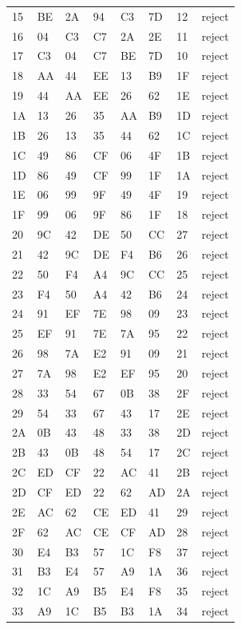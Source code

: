 \begin{longtable}{llllllll}
15 & BE & 2A & 94 & C3 & 7D & 12 & reject\\
16 & 04 & C3 & C7 & 2A & 2E & 11 & reject\\
17 & C3 & 04 & C7 & BE & 7D & 10 & reject\\
18 & AA & 44 & EE & 13 & B9 & 1F & reject\\
19 & 44 & AA & EE & 26 & 62 & 1E & reject\\
1A & 13 & 26 & 35 & AA & B9 & 1D & reject\\
1B & 26 & 13 & 35 & 44 & 62 & 1C & reject\\
1C & 49 & 86 & CF & 06 & 4F & 1B & reject\\
1D & 86 & 49 & CF & 99 & 1F & 1A & reject\\
1E & 06 & 99 & 9F & 49 & 4F & 19 & reject\\
1F & 99 & 06 & 9F & 86 & 1F & 18 & reject\\
20 & 9C & 42 & DE & 50 & CC & 27 & reject\\
21 & 42 & 9C & DE & F4 & B6 & 26 & reject\\
22 & 50 & F4 & A4 & 9C & CC & 25 & reject\\
23 & F4 & 50 & A4 & 42 & B6 & 24 & reject\\
24 & 91 & EF & 7E & 98 & 09 & 23 & reject\\
25 & EF & 91 & 7E & 7A & 95 & 22 & reject\\
26 & 98 & 7A & E2 & 91 & 09 & 21 & reject\\
27 & 7A & 98 & E2 & EF & 95 & 20 & reject\\
28 & 33 & 54 & 67 & 0B & 38 & 2F & reject\\
29 & 54 & 33 & 67 & 43 & 17 & 2E & reject\\
2A & 0B & 43 & 48 & 33 & 38 & 2D & reject\\
2B & 43 & 0B & 48 & 54 & 17 & 2C & reject\\
2C & ED & CF & 22 & AC & 41 & 2B & reject\\
2D & CF & ED & 22 & 62 & AD & 2A & reject\\
2E & AC & 62 & CE & ED & 41 & 29 & reject\\
2F & 62 & AC & CE & CF & AD & 28 & reject\\
30 & E4 & B3 & 57 & 1C & F8 & 37 & reject\\
31 & B3 & E4 & 57 & A9 & 1A & 36 & reject\\
32 & 1C & A9 & B5 & E4 & F8 & 35 & reject\\
33 & A9 & 1C & B5 & B3 & 1A & 34 & reject\\

\end{longtable}
